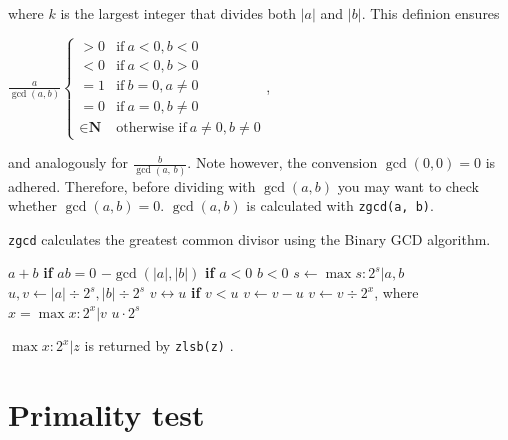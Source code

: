 \noindent
where $k$ is the largest integer that divides
both $\lvert a \rvert$ and $\lvert b \rvert$. This
definion ensures

\vspace{1em}
\( \displaystyle{
    \frac{a}{\gcd(a, b)} \left \lbrace \begin{array}{rl}
        > 0 & \textrm{if}~ a < 0, b < 0 \\
        < 0 & \textrm{if}~ a < 0, b > 0 \\
        = 1 & \textrm{if}~ b = 0, a \neq 0 \\
        = 0 & \textrm{if}~ a = 0, b \neq 0 \\
        \in \textbf{N} & \textrm{otherwise if}~ a \neq 0, b \neq 0
    \end{array} \right .
}\),
\vspace{1em}

\noindent
and analogously for $\frac{b}{\gcd(a,\,b)}$. Note however,
the convension $\gcd(0, 0) = 0$ is adhered. Therefore,
before dividing with $\gcd(a, b)$ you may want to check
whether $\gcd(a, b) = 0$. $\gcd(a, b)$ is calculated
with {\tt zgcd(a, b)}.

{\tt zgcd} calculates the greatest common divisor using
the Binary GCD algorithm.

\vspace{1em}
\hspace{-2.8ex}
\begin{minipage}{\linewidth}
\begin{algorithmic}
    \RETURN $a + b$ {\bf if} $ab = 0$
    \RETURN $-\gcd(\lvert a \rvert, \lvert b \rvert)$ {\bf if} $a < 0$ \AND $b < 0$
    \STATE $s \gets \max s : 2^s \vert a, b$
    \STATE $u, v \gets \lvert a \rvert \div 2^s, \lvert b \rvert \div 2^s$
        \STATE $v \leftrightarrow u$ {\bf if} $v < u$
        \STATE $v \gets v - u$
        \STATE $v \gets v \div 2^x$, where $x = \max x : 2^x \vert v$
    \ENDWHILE
    \RETURN $u \cdot 2^s$
\end{algorithmic}
\end{minipage}
\vspace{1em}

\noindent
$\max x : 2^x \vert z$ is returned by {\tt zlsb(z)}
.


\newpage
\section{Primality test}
\label{sec:Primality test}

